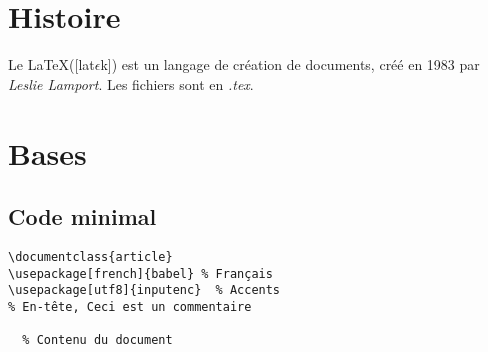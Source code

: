 


    \section{Histoire}
        Le \LaTeX ([lat$\epsilon$k]) est un langage de création de documents, créé en 1983 par \textit{Leslie Lamport}. Les fichiers sont en \textit{.tex}.
    \section{Bases}
        \subsection{Code minimal}
            \begin{lstlisting}
\documentclass{article}
\usepackage[french]{babel} % Français
\usepackage[utf8]{inputenc}  % Accents
% En-tête, Ceci est un commentaire

  % Contenu du document

            \end{lstlisting}
